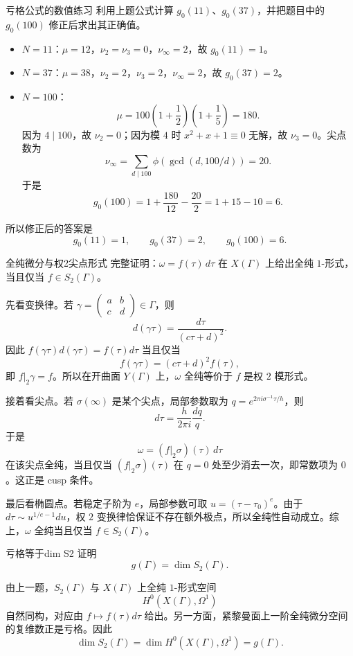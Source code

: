 \begin{problem}{亏格公式的数值练习}
利用上题公式计算 $g_0(11)$、$g_0(37)$，并把题目中的 $g_0(100)$ 修正后求出其正确值。
\end{problem}
\begin{solution}
\begin{itemize}
\item $N=11$：$\mu=12$，$\nu_2=\nu_3=0$，$\nu_\infty=2$，故 $g_0(11)=1$。
\item $N=37$：$\mu=38$，$\nu_2=2$，$\nu_3=2$，$\nu_\infty=2$，故 $g_0(37)=2$。
\item $N=100$：
\[
\mu=100\left(1+\frac12\right)\left(1+\frac15\right)=180.
\]
因为 $4\mid100$，故 $\nu_2=0$；因为模 $4$ 时 $x^2+x+1\equiv0$ 无解，故 $\nu_3=0$。尖点数为
\[
\nu_\infty=\sum_{d\mid100}\phi(\gcd(d,100/d))=20.
\]
于是
\[
g_0(100)=1+\frac{180}{12}-\frac{20}{2}=1+15-10=6.
\]
\end{itemize}
所以修正后的答案是
\[
g_0(11)=1,\qquad g_0(37)=2,\qquad g_0(100)=6.
\]
\end{solution}

\begin{problem}{全纯微分与权2尖点形式}
完整证明：$\omega=f(\tau)\,d\tau$ 在 $X(\Gamma)$ 上给出全纯 $1$-形式，当且仅当 $f\in S_2(\Gamma)$。
\end{problem}
\begin{solution}
先看变换律。若 $\gamma=\begin{pmatrix}a&b\\c&d\end{pmatrix}\in\Gamma$，则
\[
d(\gamma\tau)=\frac{d\tau}{(c\tau+d)^2}.
\]
因此 $f(\gamma\tau)d(\gamma\tau)=f(\tau)d\tau$ 当且仅当
\[
f(\gamma\tau)=(c\tau+d)^2f(\tau),
\]
即 $f|_2\gamma=f$。所以在开曲面 $Y(\Gamma)$ 上，$\omega$ 全纯等价于 $f$ 是权 $2$ 模形式。

接着看尖点。若 $\sigma(\infty)$ 是某个尖点，局部参数取为 $q=e^{2\pi i\sigma^{-1}\tau/h}$，则
\[
d\tau=\frac{h}{2\pi i}\frac{dq}{q}.
\]
于是
\[
\omega=(f|_2\sigma)(\tau)\,d\tau
\]
在该尖点全纯，当且仅当 $(f|_2\sigma)(\tau)$ 在 $q=0$ 处至少消去一次，即常数项为 $0$。这正是 cusp 条件。

最后看椭圆点。若稳定子阶为 $e$，局部参数可取 $u=(\tau-\tau_0)^e$。由于 $d\tau\sim u^{1/e-1}du$，权 $2$ 变换律恰保证不存在额外极点，所以全纯性自动成立。综上，$\omega$ 全纯当且仅当 $f\in S_2(\Gamma)$。
\end{solution}

\begin{problem}{亏格等于dim S2}
证明
\[
g(\Gamma)=\dim S_2(\Gamma).
\]
\end{problem}
\begin{solution}
由上一题，$S_2(\Gamma)$ 与 $X(\Gamma)$ 上全纯 $1$-形式空间
\[
H^0(X(\Gamma),\Omega^1)
\]
自然同构，对应由 $f\mapsto f(\tau)d\tau$ 给出。另一方面，紧黎曼面上一阶全纯微分空间的复维数正是亏格。因此
\[
\dim S_2(\Gamma)=\dim H^0(X(\Gamma),\Omega^1)=g(\Gamma).
\]
\end{solution}

